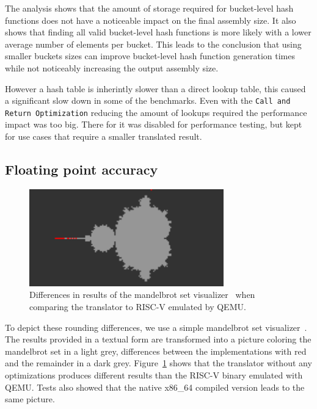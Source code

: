 \documentclass[course=eragp]{aspdoc}
\begin{document}
\par

The analysis shows that
the amount of storage required for bucket-level hash functions does not have a noticeable impact on
the final assembly size. It also shows that finding all valid bucket-level hash functions is more
likely with a lower average number of elements per bucket. This leads to the conclusion that using
smaller buckets sizes can improve bucket-level hash function generation times while not noticeably
increasing the output assembly size.

\par

However a hash table is inherintly slower than a direct lookup table, this caused a significant slow down
in some of the benchmarks.
Even with the \texttt{Call and Return Optimization} reducing the amount of lookups required the performance
impact was too big.
There for it was disabled for performance testing, but kept for use cases that require a smaller translated
result.

\subsection{Floating point accuracy}

\begin{figure}[H]
    \centering
    \includegraphics[width=0.75\textwidth]{images/mandelbrot_differences/translated_diff.png}
    \caption{Differences in results of the mandelbrot set visualizer~\cite{mandelbrot_program} when
        comparing the translator to RISC-V emulated by QEMU.}\label{fig:mandelbrot_diff_translator}
\end{figure}

To depict these rounding differences, we use a simple mandelbrot set
visualizer~\cite{mandelbrot_program}. The results provided in a textual form are transformed into a
picture coloring the mandelbrot set in a light grey, differences between the implementations with
red and the remainder in a dark grey. Figure~\ref{fig:mandelbrot_diff_translator} shows that the
translator without any optimizations produces different results than the RISC-V binary emulated with
QEMU. Tests also showed that the native x86\_64 compiled version leads to the same picture.
\end{document}
